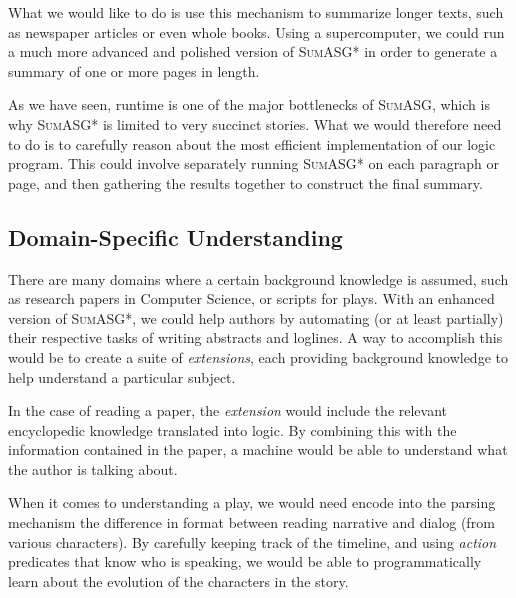 What we would like to do is use this mechanism to summarize longer texts, such as newspaper articles or even whole books. Using a supercomputer, we could run a much more advanced and polished version of \textsc{SumASG*} in order to generate a summary of one or more pages in length.

As we have seen, runtime is one of the major bottlenecks of \textsc{SumASG}, which is why \textsc{SumASG*} is limited to very succinct stories. What we would therefore need to do is to carefully reason about the most efficient implementation of our logic program. This could involve separately running \textsc{SumASG*} on each paragraph or page, and then gathering the results together to construct the final summary.

\subsection{Domain-Specific Understanding}

There are many domains where a certain background knowledge is assumed, such as research papers in Computer Science, or scripts for plays. With an enhanced version of \textsc{SumASG*}, we could help authors by automating (or at least partially) their respective tasks of writing abstracts and loglines. A way to accomplish this would be to create a suite of \textit{extensions}, each providing background knowledge to help understand a particular subject.

In the case of reading a paper, the \textit{extension} would include the relevant encyclopedic knowledge translated into logic. By combining this with the information contained in the paper, a machine would be able to understand what the author is talking about.

When it comes to understanding a play, we would need encode into the parsing mechanism the difference in format between reading narrative and dialog (from various characters). By carefully keeping track of the timeline, and using \textit{action} predicates that know who is speaking, we would be able to programmatically learn about the evolution of the characters in the story.